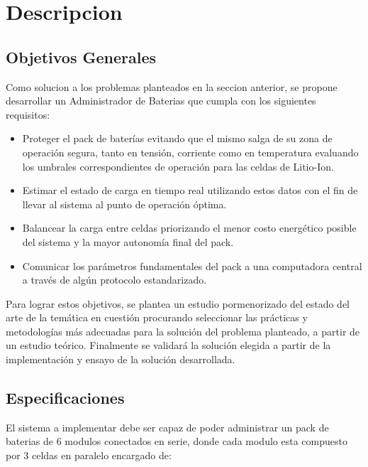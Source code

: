 \documentclass[10pt,a4paper]{article}
\begin{document}
    \section{Descripcion}\label{descripcion}
	
	\subsection{Objetivos Generales}

    Como solucion a los problemas planteados en la seccion anterior, se propone
	desarrollar un Administrador de Baterias que cumpla con los siguientes
    requisitos:

    \begin{itemize}
        \item Proteger el pack de baterías evitando que el mismo salga de su 
        zona de operación segura, tanto en tensión, corriente como en 
        temperatura evaluando los umbrales correspondientes de operación para 
        las celdas de Litio-Ion.
        \item Estimar el estado de carga en tiempo real utilizando estos datos 
        con el fin de llevar al sistema al punto de operación óptima.
        \item Balancear la carga entre celdas priorizando el menor costo 
        energético posible del sistema y la mayor autonomía final del pack.
        \item Comunicar los parámetros fundamentales del pack a una computadora 
        central a través de algún protocolo estandarizado.
    \end{itemize}

	\noindent Para lograr estos objetivos, se plantea un estudio pormenorizado 
    del estado del arte de la temática en cuestión procurando seleccionar las 
    prácticas y metodologías más adecuadas para la solución del problema 
    planteado, a partir de un estudio teórico. Finalmente se validará la 
    solución elegida a partir de la implementación y ensayo de la solución 
    desarrollada.
	
	\subsection{Especificaciones}

    \noindent El sistema a implementar debe ser capaz de poder administrar un 
    pack de baterias de 6 modulos conectados en serie, donde cada modulo esta 
    compuesto por 3 celdas en paralelo encargado de: 
	
\end{document}
